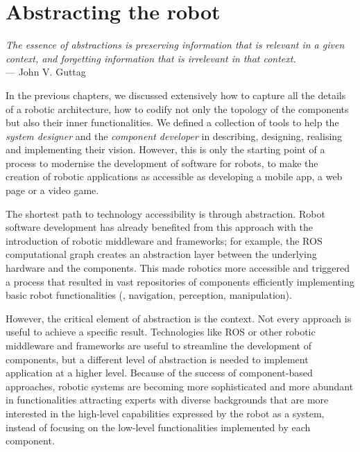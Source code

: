 \chapter[Abstracting the robot]{Abstracting the robot}\label{ch:capabilities}

\begin{flushright}{\slshape The essence of abstractions is preserving information that is relevant in a given context, and forgetting information that is irrelevant in that context.} \\ \medskip
    ---  John V. Guttag
\end{flushright}

In the previous chapters, we discussed extensively how to capture all the details of a robotic architecture, how to codify not only the topology of the components but also their inner functionalities. We defined a collection of tools to help the \textit{system designer} and the \textit{component developer} in describing, designing, realising and implementing their vision. However, this is only the starting point of a process to modernise the development of software for robots, to make the creation of robotic applications as accessible as developing a mobile app, a web page or a video game.

The shortest path to technology accessibility is through abstraction. Robot software development has already benefited from this approach with the introduction of robotic middleware and frameworks; for example, the ROS computational graph creates an abstraction layer between the underlying hardware and the components. This made robotics more accessible and triggered a process that resulted in vast repositories of components efficiently implementing basic robot functionalities (\eg, navigation, perception, manipulation). 

However, the critical element of abstraction is the context. Not every approach is useful to achieve a specific result. Technologies like ROS or other robotic middleware and frameworks are useful to streamline the development of components, but a different level of abstraction is needed to implement application at a higher level. Because of the success of component-based approaches, robotic systems are becoming more sophisticated and more abundant in functionalities attracting experts with diverse backgrounds that are more interested in the high-level capabilities expressed by the robot as a system, instead of focusing on the low-level functionalities implemented by each component.

